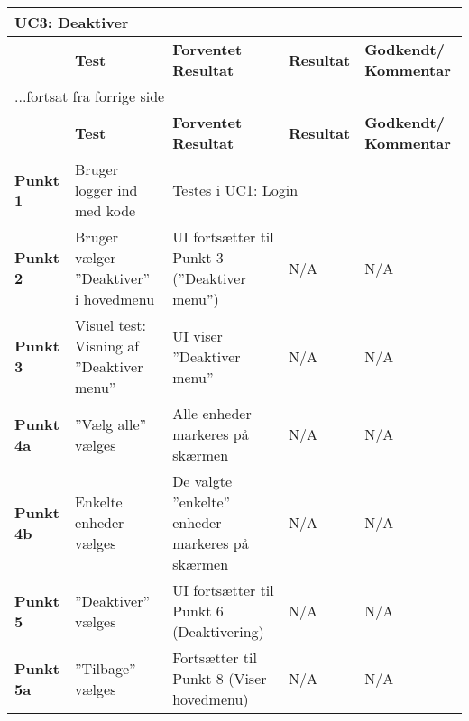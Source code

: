 
\begin{center}
\begin{longtable}{|p{}|p{}|p{3cm}|p{3cm}|p{3cm}|} %
\hline
\multicolumn{5}{|l|}{\textbf{UC3: Deaktiver}} \\ \hline
\multicolumn{1}{|c|}{} &
\textbf{Test} &
\textbf{Forventet \newline Resultat} &
\textbf{Resultat} &
\textbf{Godkendt/ \newline Kommentar} \\ \hline 
\endfirsthead

\multicolumn{5}{l}{...fortsat fra forrige side} \\ \hline 
\multicolumn{1}{|c|}{} &
\textbf{Test} &
\textbf{Forventet \newline Resultat} &
\textbf{Resultat} &
\textbf{Godkendt/ \newline Kommentar} \\ \hline 
\endhead


\textbf{Punkt 1}		&Bruger logger ind med kode	
					&\multicolumn{3}{l|}{Testes i UC1: Login} \\\hline
		
\textbf{Punkt 2}		&Bruger vælger ''Deaktiver'' i hovedmenu																
					&UI fortsætter til Punkt 3 (''Deaktiver menu'')
					&N/A 
					&N/A \\\hline
					
\textbf{Punkt 3}		&Visuel test: Visning af ''Deaktiver menu''																
					&UI viser ''Deaktiver menu''
					&N/A 
					&N/A \\\hline
		
\textbf{Punkt 4a}	&''Vælg alle'' vælges		
					&Alle enheder markeres på skærmen		 	
					&N/A 
					&N/A \\\hline

\textbf{Punkt 4b}	&Enkelte enheder vælges
					&De valgte ''enkelte'' enheder markeres på skærmen
					&N/A 
					&N/A \\\hline

\textbf{Punkt 5}		&''Deaktiver'' vælges			
					&UI fortsætter til Punkt 6 (Deaktivering)
					&N/A 
					&N/A \\\hline
					
\textbf{Punkt 5a}	&''Tilbage'' vælges			
					&Fortsætter til Punkt 8 (Viser hovedmenu)
					&N/A 
					&N/A \\\hline


\end{longtable}
\end{center}
